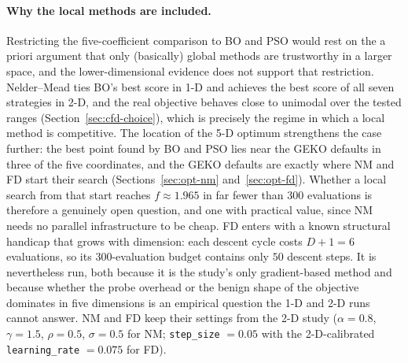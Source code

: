 \paragraph{Why the local methods are included.}
Restricting the five-coefficient comparison to BO and PSO would rest on
the a priori argument that only (basically) global methods are trustworthy
in a larger space, and the lower-dimensional evidence does not support
that restriction.  Nelder--Mead ties BO's best score in 1-D and achieves
the best score of all seven strategies in 2-D, and the real objective
behaves close to unimodal over the tested ranges
(Section~\ref{sec:cfd-choice}), which is precisely the regime in which a
local method is competitive.  The location of the 5-D optimum strengthens
the case further: the best point found by BO and PSO lies near the GEKO
defaults in three of the five coordinates, and the GEKO defaults are
exactly where NM and FD start their search
(Sections~\ref{sec:opt-nm} and~\ref{sec:opt-fd}).  Whether a local search
from that start reaches $f \approx 1.965$ in far fewer than $300$
evaluations is therefore a genuinely open question, and one with
practical value, since NM needs no parallel infrastructure to be cheap.
FD enters with a known structural handicap that grows with dimension:
each descent cycle costs $D{+}1 = 6$ evaluations, so its $300$-evaluation
budget contains only $50$ descent steps.  It is nevertheless run, both
because it is the study's only gradient-based method and because whether
the probe overhead or the benign shape of the objective dominates in five
dimensions is an empirical question the 1-D and 2-D runs cannot answer.
NM and FD keep their settings from the 2-D study ($\alpha=0.8$,
$\gamma=1.5$, $\rho=0.5$, $\sigma=0.5$ for NM; \texttt{step\_size}
$=0.05$ with the 2-D-calibrated \texttt{learning\_rate} $=0.075$ for FD).

